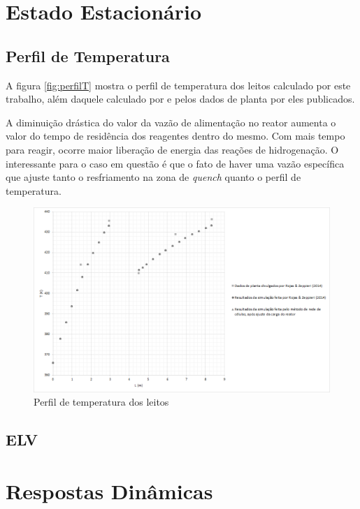 \section{Estado Estacionário} \label{sec:estadoestacionario}

\subsection{Perfil de Temperatura} \label{sec:perfildetemperatura}

A figura \autoref{fig:perfilT} mostra o perfil de temperatura dos leitos
calculado por este trabalho, além daquele calculado por 
e pelos dados de planta por eles publicados.  

A diminuição drástica do valor da vazão de alimentação no reator aumenta o
valor do tempo de residência dos reagentes dentro do mesmo. Com mais tempo para
reagir, ocorre maior liberação de energia das reações de hidrogenação. O
interessante para o caso em questão é que o fato de haver uma vazão específica
que ajuste tanto o resfriamento na zona de \emph{quench} quanto o perfil de
temperatura.

\begin{figure}[htb]
\centering \includegraphics[scale=0.4]{images/Chap4/perfilT.png}
\caption{Perfil de temperatura dos leitos}
\label{fig:perfilT}
\end{figure}

\subsection{ELV}



\section{Respostas Dinâmicas} \label{sec:respostasdinamicas}





























